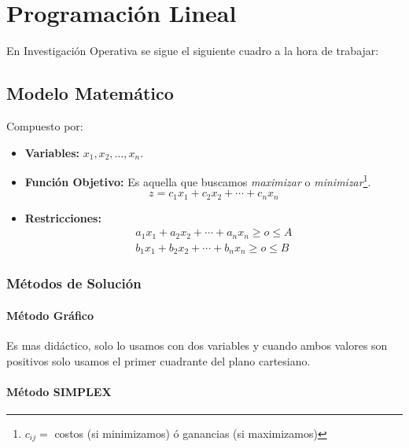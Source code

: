 \documentclass[10pt,a4paper]{book}
\begin{document}

\chapter{Programación Lineal}
En Investigación Operativa se sigue el siguiente cuadro a la hora de trabajar:
\begin{center}
\end{center}

\section{Modelo Matemático}
Compuesto por:
\begin{itemize}
\item \textbf{Variables:} $x_1,x_2,\ldots ,x_n$.
\item \textbf{Función Objetivo:} Es aquella que buscamos \textit{maximizar} o \textit{minimizar}\footnote{$c_{ij}=$ costos (si minimizamos) ó ganancias (si maximizamos)}. 
$$z = c_1 x_1 + c_2 x_2 + \cdots +c_n x_n$$
\item \textbf{Restricciones:}
\begin{align*}
a_1 x_1 + a_2 x_2 + \cdots + a_n x_n \geq o \leq A\\
b_1 x_1 + b_2 x_2 + \cdots + b_n x_n \geq o \leq B
\end{align*}
\end{itemize}
\subsection{Métodos de Solución}
\subsubsection{Método Gráfico}
Es mas didáctico, solo lo usamos con dos variables y cuando ambos valores son positivos solo usamos el primer cuadrante del plano cartesiano.
\subsubsection{Método SIMPLEX}
\end{document}

